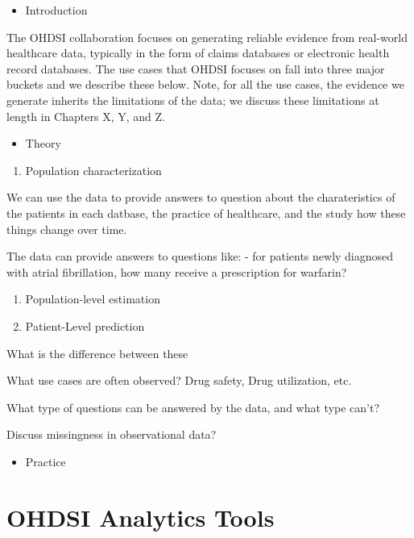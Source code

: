 \documentclass[]{book}
\providecommand{\tightlist}{%
  \setlength{\itemsep}{0pt}\setlength{\parskip}{0pt}}
\begin{document}
\begin{itemize}
\tightlist
\item
  Introduction
\end{itemize}

The OHDSI collaboration focuses on generating reliable evidence from
real-world healthcare data, typically in the form of claims databases or
electronic health record databases. The use cases that OHDSI focuses on
fall into three major buckets and we describe these below. Note, for all
the use cases, the evidence we generate inherits the limitations of the
data; we discuss these limitations at length in Chapters X, Y, and Z.

\begin{itemize}
\tightlist
\item
  Theory
\end{itemize}

\begin{enumerate}
\def\labelenumi{\arabic{enumi}.}
\tightlist
\item
  Population characterization
\end{enumerate}

We can use the data to provide answers to question about the
charateristics of the patients in each datbase, the practice of
healthcare, and the study how these things change over time.

The data can provide answers to questions like: - for patients newly
diagnosed with atrial fibrillation, how many receive a prescription for
warfarin?

\begin{enumerate}
\def\labelenumi{\arabic{enumi}.}
\setcounter{enumi}{1}
\item
  Population-level estimation
\item
  Patient-Level prediction
\end{enumerate}

What is the difference between these

What use cases are often observed? Drug safety, Drug utilization, etc.

What type of questions can be answered by the data, and what type can't?

Discuss missingness in observational data?

\begin{itemize}
\tightlist
\item
  Practice
\end{itemize}

\chapter{OHDSI Analytics Tools}\label{OhdsiAnalyticsTools}
\end{document}
